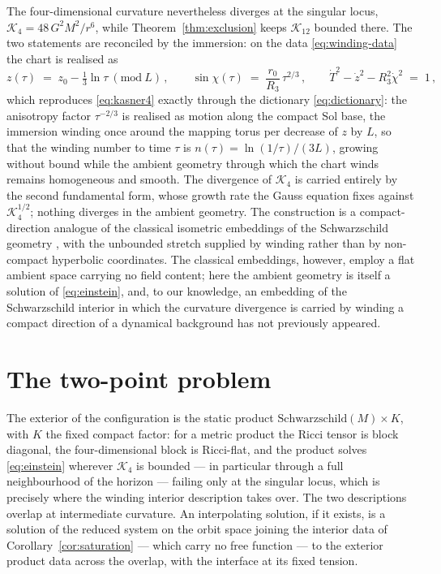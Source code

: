 \documentclass[11pt]{article}
\numberwithin{equation}{section}
\theoremstyle{plain}
\theoremstyle{definition}
\theoremstyle{remark}
\newcommand{\Kr}{\mathcal{K}}
\newcommand{\Geff}{G}
\begin{document}
The four-dimensional curvature nevertheless diverges at the singular
locus, $\Kr_{4} = 48\,\Geff^{2}M^{2}/r^{6}$, while
Theorem~\ref{thm:exclusion} keeps $\Kr_{12}$ bounded there. The two
statements are reconciled by the immersion: on the data
\eqref{eq:winding-data} the chart is realised as
\begin{equation}\label{eq:winding}
z(\tau) \;=\; z_{0} - \tfrac13\ln\tau \ (\mathrm{mod}\ L)\,, \qquad
\sin\chi(\tau) \;=\; \frac{r_{0}}{R_{3}}\,\tau^{2/3}\,, \qquad
\dot T^{2} - \dot z^{2} - R_{3}^{2}\dot\chi^{2} \;=\; 1\,,
\end{equation}
which reproduces \eqref{eq:kasner4} exactly through the dictionary
\eqref{eq:dictionary}: the anisotropy factor $\tau^{-2/3}$ is realised
as motion along the compact Sol base, the immersion winding once
around the mapping torus per decrease of $z$ by $L$, so that the
winding number to time $\tau$ is $n(\tau) = \ln(1/\tau)/(3L)$, growing
without bound while the ambient geometry through which the chart winds
remains homogeneous and smooth. The divergence of $\Kr_{4}$ is carried
entirely by the second fundamental form, whose growth rate the Gauss
equation fixes against $\Kr_{4}^{1/2}$; nothing diverges in the
ambient geometry. The construction is a compact-direction analogue of
the classical isometric embeddings of the Schwarzschild geometry
\cite{Fronsdal1959}, with the unbounded stretch supplied by winding
rather than by non-compact hyperbolic coordinates. The classical
embeddings, however, employ a flat ambient space carrying no field
content; here the ambient geometry is itself a solution of
\eqref{eq:einstein}, and, to our knowledge, an embedding of the
Schwarzschild interior in which the curvature divergence is carried by
winding a compact direction of a dynamical background has not
previously appeared.

\section{The two-point problem}\label{sec:twopoint}

The exterior of the configuration is the static product
$\mathrm{Schwarzschild}(M) \times K$, with $K$ the fixed compact
factor: for a metric product the Ricci tensor is block diagonal, the
four-dimensional block is Ricci-flat, and the product solves
\eqref{eq:einstein} wherever $\Kr_{4}$ is bounded --- in particular
through a full neighbourhood of the horizon --- failing only at the
singular locus, which is precisely where the winding interior
description takes over. The two descriptions overlap at intermediate
curvature. An interpolating solution, if it exists, is a solution of
the reduced system on the orbit space joining the interior data of
Corollary~\ref{cor:saturation} --- which carry no free function ---
to the exterior product data across the overlap, with the interface at
its fixed tension.
\end{document}
